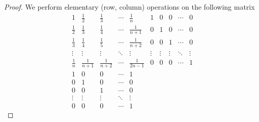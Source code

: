 \begin{proof}
    We perform elementary (row, column) operations on the following matrix
    \[
        \begin{array}{ccccc|ccccc}
            1           & \frac{1}{2}   & \frac{1}{3}   & \cdots & \frac{1}{n}    & 1      & 0      & 0      & \cdots & 0      \\
            \frac{1}{2} & \frac{1}{3}   & \frac{1}{4}   & \cdots & \frac{1}{n+1}  & 0      & 1      & 0      & \cdots & 0      \\
            \frac{1}{3} & \frac{1}{4}   & \frac{1}{5}   & \cdots & \frac{1}{n+2}  & 0      & 0      & 1      & \cdots & 0      \\
            \vdots      & \vdots        & \vdots        & \ddots & \vdots         & \vdots & \vdots & \vdots & \ddots & \vdots \\
            \frac{1}{n} & \frac{1}{n+1} & \frac{1}{n+2} & \cdots & \frac{1}{2n-1} & 0      & 0      & 0      & \cdots & 1      \\
            \hline
            1           & 0             & 0             & \cdots & 1                                                           \\
            0           & 1             & 0             & \cdots & 0                                                           \\
            0           & 0             & 1             & \cdots & 0                                                           \\
            \vdots      & \vdots        & \vdots        & \ddots & \vdots                                                      \\
            0           & 0             & 0             & \cdots & 1
        \end{array}
    \]
\end{proof}
